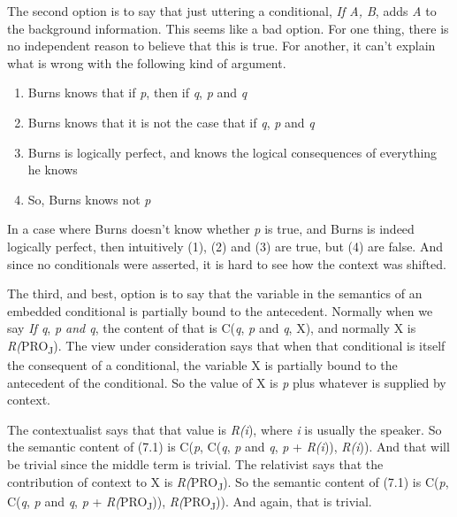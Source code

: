 The second option is to say that just uttering a conditional, \textit{If A, B}, adds \textit{A} to the background information. This seems like a bad option. For one thing, there is no independent reason to believe that this is true. For another, it can't explain what is wrong with the following kind of argument.

\renewcommand{\labelenumi}{(\arabic{enumi})}
\begin{enumerate}
\setcounter{enumi}{0}
\item Burns knows that if \textit{p}, then if \textit{q}, \textit{p} and \textit{q}

\item Burns knows that it is not the case that if \textit{q}, \textit{p} and \textit{q}

\item Burns is logically perfect, and knows the logical consequences of everything he knows

\item So, Burns knows not \textit{p}
\end{enumerate}

\noindent In a case where Burns doesn't know whether \textit{p} is true, and Burns is indeed logically perfect, then intuitively (1), (2) and (3) are true, but (4) are false. And since no conditionals were asserted, it is hard to see how the context was shifted.

The third, and best, option is to say that the variable in the semantics of an embedded conditional is partially bound to the antecedent. Normally when we say \textit{If q}, \textit{p and q}, the content of that is C(\textit{q}, \textit{p} and \textit{q}, X), and normally X is \textit{R(}PRO\textsubscript{J}). The view under consideration says that when that conditional is itself the consequent of a conditional, the variable X is partially bound to the antecedent of the conditional. So the value of X is \textit{p} plus whatever is supplied by context. 

The contextualist says that that value is \textit{R(i}), where \textit{i} is usually the speaker. So the semantic content of (7.1) is C(\textit{p}, C(\textit{q}, \textit{p} and \textit{q}, \textit{p} + \textit{R(i})), \textit{R(i})). And that will be trivial since the middle term is trivial. The relativist says that the contribution of context to X is \textit{R(}PRO\textsubscript{J}). So the semantic content of (7.1) is C(\textit{p}, C(\textit{q}, \textit{p} and \textit{q}, \textit{p} + \textit{R(}PRO\textsubscript{J})), \textit{R(}PRO\textsubscript{J})). And again, that is trivial.

